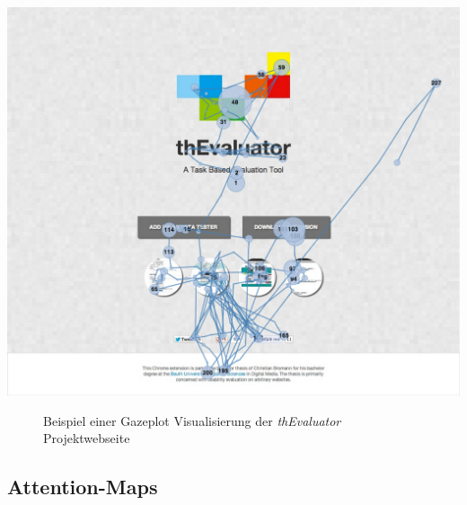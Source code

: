 \vspace{0.3cm}
\begin{center}
\includegraphics[scale=0.35]{./images/gazeplot}
\end{center}
\begin{figure}[htb]
   \centering
   \caption{Beispiel einer Gazeplot Visualisierung der \textit{thEvaluator} Projektwebseite}
    \label{gazeplot}
\end{figure}


\subsection{Attention-Maps}

